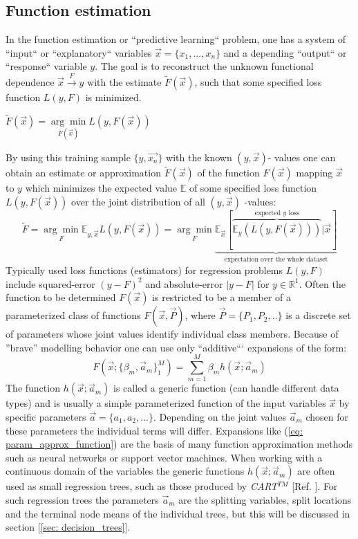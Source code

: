 \documentclass[12pt, a4paper]{article}
\begin{document}
\subsection{Function estimation}
In the function estimation or ``predictive learning`` problem, one has a system of ``input`` or ``explanatory`` variables $\vec{x} = \{x_1,...,x_n\}$ and a depending ``output`` or ``response`` variable $y$. The goal is to reconstruct the unknown functional dependence $\vec{x} \xrightarrow{F} y$ with the estimate $\tilde{F}(\vec{x})$, such that some specified loss function $L(y,F)$ is minimized.
\begin{center}
    $\tilde{F}(\vec{x}) = \underset{F(\vec{x})}{\arg\min} L(y,F(\vec{x}))$ 
\end{center}
By using this training sample $\{y,\vec{x_n}\}$ with the known $(y,\vec{x})$- values one can obtain an estimate or approximation $\tilde{F}(\vec{x})$ of the function $F(\vec{x})$ mapping $\vec{x}$ to $y$ which minimizes the expected value $\mathbb{E}$ of some specified loss function $L(y,F(\vec{x}))$ over the joint distribution of all $(y,\vec{x})$ -values:
\begin{equation}
    \tilde{F} = \underset{F}{\arg\min} \mathbb{E}_{y,\vec{x}} L(y,F(\vec{x})) = \underset{F}{\arg\min} \underbrace{\mathbb{E}_{\vec{x}} [\overbrace{\mathbb{E}_y (L(y,F(\vec{x})))}^\text{expected $y$ loss}|\vec{x}]}_\text{expectation over the whole dataset}
\end{equation}
Typically used loss functions (estimators) for regression problems $L(y,F)$ include squared-error $(y - F)^2$ and absolute-error $|y - F|$ for $y \in \mathbb{R}^1$.
Often the function to be determined $F(\vec{x})$ is restricted to be a member of a parameterized class of functions $F(\vec{x},\vec{P})$, where $\vec{P} = \{P_1,P_2,..\}$ is a discrete set of parameters whose joint values identify individual class members. Because of ''brave'' modelling behavior one can use only ``additive``` expansions of the form:
\begin{equation}
    F(\vec{x};\{\beta_m, \vec{a}_m\}_1^M) = \sum_{m=1}^{M} \beta_m h(\vec{x};\vec{a}_m)
    \label{eq: param_approx_function}
\end{equation}
The function $h(\vec{x};\vec{a}_m)$ is called a generic function (can handle different data types) and is usually a simple parameterized function of the input variables $\vec{x}$ by specific parameters $\vec{a} = \{a_1,a_2,...\}$. Depending on the joint values $\vec{a}_m$ chosen for these parameters the individual terms will differ. Expansions like (\ref{eq: param_approx_function}) are the basis of many function approximation methods such as neural networks or support vector machines. When working with a continuous domain of the variables the generic functions $h(\vec{x};\vec{a}_m)$ are often used as small regression trees, such as those produced by \textit{CART}$^{TM}$ [Ref. \cite{Breiman1984}]. For such regression trees the parameters $\vec{a}_m$ are the splitting variables, split locations and the terminal node means of the individual trees, but this will be discussed in section [\ref{sec: decision_trees}].
\end{document}
